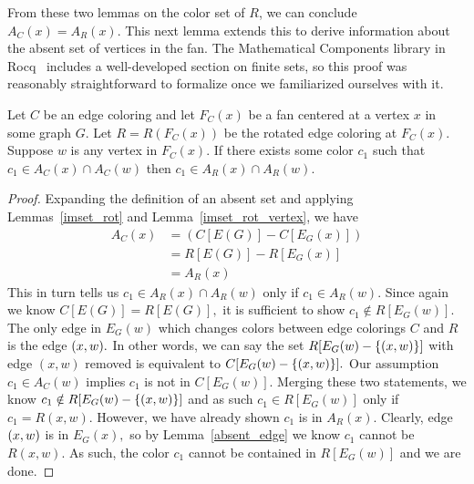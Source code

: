 From these two lemmas on the color set of $R$, we can conclude $A_C(x) = A_R(x).$ This next lemma extends this to derive information about the absent set of vertices in the fan. The Mathematical Components library in Rocq~\cite{mathcomp} includes a well-developed section on finite sets, so this proof was reasonably straightforward to formalize once we familiarized ourselves with it. 
\begin{lemma}\label{rot_absent_fan}
    Let $C$ be an edge coloring and let $F_C(x)$ be a fan centered at a vertex $x$ in some graph $G.$ Let $R = R(F_C(x))$ be the rotated edge coloring at $F_C(x)$. Suppose $w$ is any vertex in $F_C(x)$. If there exists some color $c_1$ such that $c_1 \in A_C(x) \cap A_C(w)$ then $c_1 \in A_R(x) \cap A_R(w).$
\end{lemma}
\begin{proof}
    Expanding the definition of an absent set and applying Lemmas~\ref{imset_rot} and Lemma~\ref{imset_rot_vertex}, we have 
    \begin{align*}
        A_C(x) &= (C[E(G)] - C[E_G(x)]) \\
        &= R[E(G)] - R[E_G(x)]\\
        &= A_R(x)
    \end{align*}   
    This in turn tells us $c_1 \in A_R(x) \cap A_R(w)$ only if $c_1 \in A_R(w).$ Since again we know $C[E(G)] = R[E(G)],$ it is sufficient to show $c_1 \notin R[E_G(w)].$ The only edge in $E_G(w)$ which changes colors between edge colorings $C$ and $R$ is the edge $(x, w).$ In other words, we can say the set $R[E_G(w) - \{(x, w)\}]$ with edge $(x, w)$ removed is equivalent to $C[E_G(w) - \{(x, w)\}].$ Our assumption $c_1 \in A_C(w)$ implies $c_1$ is not in $C[E_G(w)].$ Merging these two statements, we know $c_1 \notin R[E_G(w) - \{(x, w)\}]$ and as such $c_1 \in R[E_G(w)]$ only if $c_1 = R(x, w).$ However, we have already shown $c_1$ is in $A_R(x).$ Clearly, edge $(x, w)$ is in $E_G(x),$ so by Lemma~\ref{absent_edge} we know $c_1$ cannot be $R(x, w).$ As such, the color $c_1$ cannot be contained in $R[E_G(w)]$ and we are done.
\end{proof}

